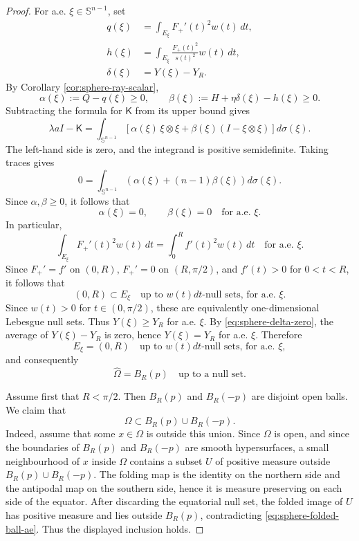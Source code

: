 \documentclass[10pt,a4paper]{amsart}
\newcommand{\Sn}{\mathbb S}
\newcommand{\Id}{I}
\newcommand{\mcK}{\mathsf K}
\begin{document}
\begin{proof}
For a.e. $\xi\in\Sn^{n-1}$, set
\begin{align*}
        q(\xi)&=\int_{E_\xi}F_+'(t)^2w(t)\,dt,\\
        h(\xi)&=\int_{E_\xi}\frac{F_+(t)^2}{s(t)^2}w(t)\,dt,\\
        \delta(\xi)&=Y(\xi)-Y_R.
\end{align*}
By Corollary \ref{cor:sphere-ray-scalar},
$$
        \alpha(\xi):=Q-q(\xi)\ge0,
        \qquad
        \beta(\xi):=H+\eta\delta(\xi)-h(\xi)\ge0.
$$
Subtracting the formula for $\mcK$ from its upper bound gives
$$
        \lambda a\Id-\mcK
        =\int_{\Sn^{n-1}}
        \left[\alpha(\xi)\,\xi\otimes\xi+\beta(\xi)(\Id-\xi\otimes\xi)\right]d\sigma(\xi).
$$
The left-hand side is zero, and the integrand is positive semidefinite.  Taking traces gives
$$
        0=\int_{\Sn^{n-1}}\left(\alpha(\xi)+(n-1)\beta(\xi)\right)d\sigma(\xi).
$$
Since $\alpha,\beta\ge0$, it follows that
$$
        \alpha(\xi)=0,
        \qquad
        \beta(\xi)=0
        \quad\text{for a.e. }\xi.
$$
In particular,
$$
        \int_{E_\xi}F_+'(t)^2w(t)\,dt
        =\int_0^R f'(t)^2w(t)\,dt
        \quad\text{for a.e. }\xi.
$$
Since $F_+'=f'$ on $(0,R)$, $F_+'=0$ on $(R,\pi/2)$, and $f'(t)>0$ for $0<t<R$, it follows that
$$
        (0,R)\subset E_\xi
        \quad\text{up to }w(t)dt\text{-null sets, for a.e. }\xi.
$$
Since $w(t)>0$ for $t\in(0,\pi/2)$, these are equivalently one-dimensional Lebesgue null sets.  Thus $Y(\xi)\ge Y_R$ for a.e. $\xi$.  By \eqref{eq:sphere-delta-zero}, the average of $Y(\xi)-Y_R$ is zero, hence $Y(\xi)=Y_R$ for a.e. $\xi$.  Therefore
$$
        E_\xi=(0,R)
        \quad\text{up to }w(t)dt\text{-null sets, for a.e. }\xi,
$$
and consequently
\begin{equation}\label{eq:sphere-folded-ball-ae}
        \widehat\Omega=B_R(p)
        \quad\text{up to a null set}.
\end{equation}

Assume first that $R<\pi/2$.  Then $B_R(p)$ and $B_R(-p)$ are disjoint open balls.  We claim that
$$
        \Omega\subset B_R(p)\cup B_R(-p).
$$
Indeed, assume that some $x\in\Omega$ is outside this union.  Since $\Omega$ is open, and since the boundaries of $B_R(p)$ and $B_R(-p)$ are smooth hypersurfaces, a small neighbourhood of $x$ inside $\Omega$ contains a subset $U$ of positive measure outside $B_R(p)\cup B_R(-p)$.  The folding map is the identity on the northern side and the antipodal map on the southern side, hence it is measure preserving on each side of the equator.  After discarding the equatorial null set, the folded image of $U$ has positive measure and lies outside $B_R(p)$, contradicting \eqref{eq:sphere-folded-ball-ae}.  Thus the displayed inclusion holds.


\end{proof}
\end{document}

